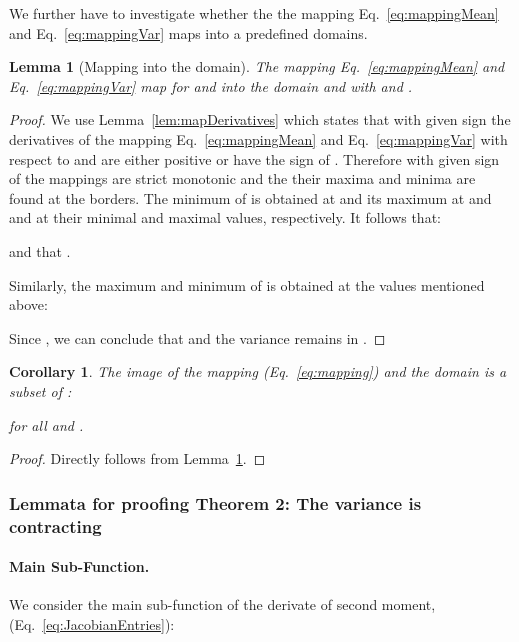 \documentclass{article}
\newtheorem{corollary}[theorem]{Corollary}\newtheorem{proposition}[theorem]{Proposition}\newtheorem{lemma}[theorem]{Lemma}\newtheorem{conjecture}[theorem]{Conjecture}\newtheorem*{theorem*}{Theorem}
\begin{document}
We further have to investigate whether the the mapping  Eq.~\eqref{eq:mappingMean}
and Eq.~\eqref{eq:mappingVar} maps into a predefined domains.

\begin{lemma}[Mapping into the domain]
\label{lem:region}
The mapping   Eq.~\eqref{eq:mappingMean}
and Eq.~\eqref{eq:mappingVar} map for 
  and 
into the domain
 and
 with  and .
\end{lemma}


\begin{proof}
We use Lemma~\ref{lem:mapDerivatives} which states that with given
sign the derivatives of the mapping Eq.~\eqref{eq:mappingMean}
and Eq.~\eqref{eq:mappingVar} with respect to  
and  are either positive or have the sign of
.
Therefore with given sign of  the mappings are strict monotonic and
the their maxima and minima are found at the borders.  The minimum of  is obtained at
 and its maximum at  and  and  at their 
minimal and maximal values, respectively. It follows that:

and that .

Similarly, the maximum and minimum of  is obtained at the values mentioned above:

Since , we can conclude that 
 and the variance remains in .
\end{proof}


\begin{corollary}
 The image  of the mapping  (Eq.~\eqref{eq:mapping})
 and the domain  is 
 a subset of : 
 
 for all  and .
\end{corollary}

\begin{proof}
 Directly follows from Lemma~\ref{lem:region}.
\end{proof}









\subsubsection{Lemmata for proofing Theorem 2: The variance is contracting}




\paragraph{Main Sub-Function.}
We consider the main sub-function of the derivate of second moment,  (Eq.~\eqref{eq:JacobianEntries}):
\end{document}

